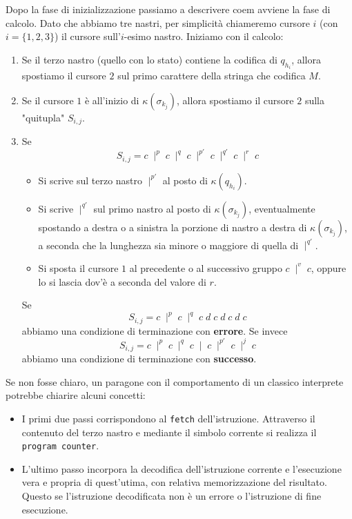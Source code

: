 Dopo la fase di inizializzazione passiamo a descrivere coem
avviene la fase di calcolo. Dato che abbiamo tre nastri, per
simplicità chiameremo cursore $i$ (con $i = \{ 1, 2, 3\}$) il
cursore sull'$i$-esimo nastro. Iniziamo con il calcolo:
\begin{enumerate}
	\item Se il terzo nastro (quello con lo stato) contiene la
	      codifica di $q_{h_i}$, allora spostiamo il cursore $2$
	      sul primo carattere della stringa che codifica $M$.
	\item Se il cursore $1$ è all'inizio di
	      $\kappa(\sigma_{k_j})$, allora spostiamo il cursore
	      $2$ sulla "quitupla" $S_{i,j}$.
	\item Se
	      \[
		      S_{i,j} = c \; \mid^p \; c \; \mid^q \; c \;
		      \mid^{p'} \; c \; \mid^{q'} \; c \; \mid^r \; c
	      \]
	      \begin{itemize}
		      \item Si scrive sul terzo nastro $\mid^{p'}$ al
		            posto di $\kappa(q_{h_i})$.
		      \item Si scrive $\mid^{q'}$ sul primo nastro al
		            posto di $\kappa(\sigma_{k_j})$,
		            eventualmente spostando a destra o a
		            sinistra la porzione di nastro a destra di
		            $\kappa(\sigma_{k_j})$, a seconda che la
		            lunghezza sia minore o maggiore di quella di
		            $\mid^{q'}$.
		      \item Si sposta il cursore $1$ al precedente o
		            al successivo gruppo $c \; \mid^v \; c$,
		            oppure lo si lascia dov'è a seconda del
		            valore di $r$.
	      \end{itemize}
	      Se
	      \[
		      S_{i,j} = c \; \mid^p \; c \; \mid^q \;
		      c \; d \; c \; d \; c \; d \; c
	      \]
	      abbiamo una condizione di terminazione con
	      \textbf{errore}. Se invece
	      \[
		      S_{i,j} = c \; \mid^p \; c \; \mid^q \; c \;
		      \mid \; c \; \mid^{p'} \; c \; \mid^j \; c
	      \]
	      abbiamo una condizione di terminazione con
	      \textbf{successo}.
\end{enumerate}
Se non fosse chiaro, un paragone con il comportamento di un
classico interprete potrebbe chiarire alcuni concetti:
\begin{itemize}
	\item I primi due passi corrispondono al \verb|fetch|
	      dell'istruzione. Attraverso il contenuto del terzo
	      nastro e mediante il simbolo corrente si realizza
	      il \verb|program counter|.
	\item L'ultimo passo incorpora la decodifica dell'istruzione
	      corrente e l'esecuzione vera e propria di quest'utima,
	      con relativa memorizzazione del risultato. Questo se
	      l'istruzione decodificata non è un errore o
	      l'istruzione di fine esecuzione.
\end{itemize}


